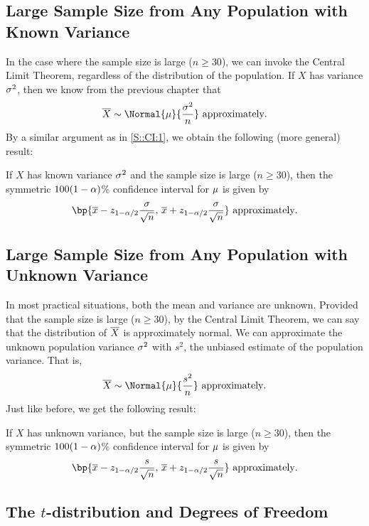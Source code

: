 \subsection{Large Sample Size from Any Population with Known Variance}\label{S::CI:2}

In the case where the sample size is large ($n \geq 30$), we can invoke the Central Limit Theorem, regardless of the distribution of the population. If $X$ has variance $\sigma^2$, then we know from the previous chapter that \[\ol{X} \sim \Normal{\m}{\frac{\s^2}{n}} \text{ approximately}.\] By a similar argument as in \SS\ref{S::CI:1}, we obtain the following (more general) result:

\begin{proposition}
    If $X$ has known variance $\sigma^2$ and the sample size is large ($n \geq 30$), then the symmetric $100(1-\alpha)$\% confidence interval for $\mu$ is given by \[\bp{\ol{x} - z_{1 - \a/2} \frac{\s}{\sqrt{n}}, \, \ol{x} + z_{1 - \a/2} \frac{\s}{\sqrt{n}}} \text{ approximately}.\]
\end{proposition}

\subsection{Large Sample Size from Any Population with Unknown Variance}\label{S::CI:3}

In most practical situations, both the mean and variance are unknown. Provided that the sample size is large ($n \geq 30$), by the Central Limit Theorem, we can say that the distribution of $\overline{X}$ is approximately normal. We can approximate the unknown population variance $\sigma^2$ with $s^2$, the unbiased estimate of the population variance. That is, \[\ol{X} \sim \Normal{\m}{\frac{s^2}{n}} \text{ approximately}.\] Just like before, we get the following result:

\begin{proposition}
    If $X$ has unknown variance, but the sample size is large ($n \geq 30$), then the symmetric $100(1-\alpha)$\% confidence interval for $\mu$ is given by \[\bp{\ol{x} - z_{1 - \a/2} \frac{s}{\sqrt{n}}, \, \ol{x} + z_{1 - \a/2} \frac{s}{\sqrt{n}}} \text{ approximately}.\]
\end{proposition}

\subsection{The $t$-distribution and Degrees of Freedom}

